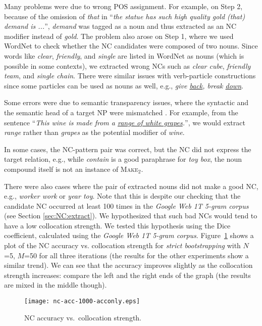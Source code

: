 \documentclass[letterpaper,11pt]{article}
\newcommand{\figref}[2][]{Figure#1~\ref{#2}\xspace}
\begin{document}
Many problems were  due to wrong POS assignment. For  example, on Step
2, because  of the omission  of \textit{that} in  ``\textit{the statue
has such  high quality gold  (that) demand is  ...}'', \textit{demand}
was tagged as a  noun and thus extracted as an  NC modifier instead of
\textit{gold}. The problem also arose on Step 1, where we used WordNet
to check whether  the NC candidates were composed of  two nouns. Since
words like \textit{clear},  \textit{friendly}, and \textit{single} are
listed in  WordNet as nouns (which  is possible in some  contexts), we
extracted  wrong NCs  such  as  \textit{clear cube},  \textit{friendly
team},  and  \textit{single chain}.  There  were  similar issues  with
verb-particle constructions since some particles  can be used as nouns
as well, e.g., \textit{give \underline{back}, break \underline{down}}.

Some errors were due to semantic transparency issues,
where the syntactic and the semantic head of a target NP were mismatched
\cite{Fillmore:2002:Seeing:arguments,Fontenelle:1999}.
For  example, from  the  sentence  ``\emph{This wine  is  made from  a
\underline{range of  white grapes}.}'', we would  extract \emph{range}
rather than \emph{grapes} as the potential modifier of \emph{wine}.

In some  cases, the NC-pattern  pair was correct,  but the NC  did not
express the  target relation, e.g.,  while \textit{contain} is  a good
paraphrase for  \textit{toy box}, the  noun compound itself is  not an
instance of \textsc{Make$_2$}.

There were also cases where the pair of extracted nouns did not make a
good NC,  e.g., \textit{worker work}  or \textit{year toy}.  Note that
this is despite  our checking that the candidate NC  occurred at least
100  times in  the \emph{Google  Web  1T 5-gram  corpus} (see  Section
\ref{sec:NC:extract}). We hypothesized that such bad NCs would tend to
have  a low  collocation  strength. We  tested  this hypothesis  using
the  Dice  coefficient,  calculated  using  the  \emph{Google  Web  1T
5-gram corpus}. \figref{fig:compositionality2} shows  a plot of the NC
accuracy vs. collocation strength for \emph{strict bootstrapping} with
$N$=5,  $M$=50 for  all three  iterations (the  results for  the other
experiments  show a  similar  trend).  We can  see  that the  accuracy
improves slightly as the collocation strength increases:
compare the left and the right ends of the graph
(the results are mixed in the middle though).

\begin{figure}[htb]
\begin{center}
\texttt{[image: nc-acc-1000-acconly.eps]}
\end{center}
\caption{NC accuracy vs.\ collocation strength.
\label{fig:compositionality2}
}
\end{figure}
\end{document}
